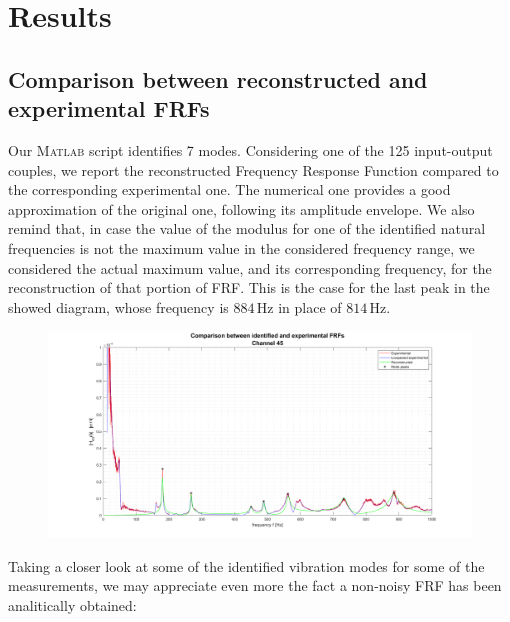 \documentclass[a4paper,12pt,oneside]{article}
\begin{document}


\section{Results}

\subsection{Comparison between reconstructed and experimental FRFs}

Our \textsc{Matlab} script identifies 7 modes. Considering one of the 125 input-output couples, we report the reconstructed Frequency Response Function compared to the corresponding experimental one. The numerical one provides a good approximation of the original one, following its amplitude envelope. We also remind that, in case the value of the modulus for one of the identified natural frequencies is not the maximum value in the considered frequency range, we considered the actual maximum value, and its corresponding frequency, for the reconstruction of that portion of FRF. This is the case for the last peak in the showed diagram, whose frequency is $ 884 \, \text{Hz} $ in place of $ 814 \, \text{Hz} $.

\begin{figure}[H]
	\hspace{-70pt}
	\includegraphics[scale=0.4]{frf_rec_vs_exp_channel45}
\end{figure}

Taking a closer look at some of the identified vibration modes for some of the measurements, we may appreciate even more the fact a non-noisy FRF has been analitically obtained:
\end{document}
